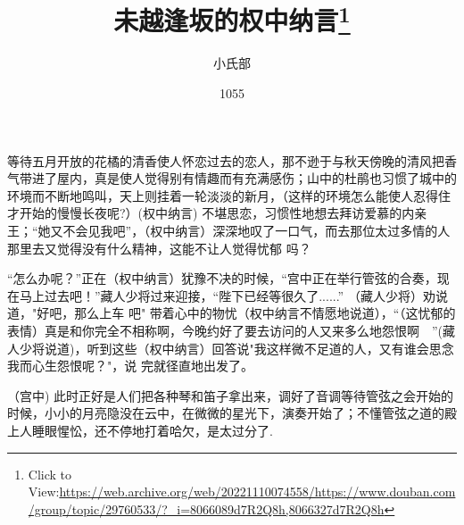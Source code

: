 \documentclass{article}
\title{未越逢坂的权中纳言\footnote{Click to View:\url{https://web.archive.org/web/20221110074558/https://www.douban.com/group/topic/29760533/?_i=8066089d7R2Q8h,8066327d7R2Q8h}}}
\author{小氏部}
\date{1055}
\begin{document}

\maketitle


\Large

﻿等待五月开放的花橘的清香使人怀恋过去的恋人，那不逊于与秋天傍晚的清风把香气带进了屋内，真是使人觉得别有情趣而有充满感伤；山中的杜鹃也习惯了城中的环境而不断地鸣叫，天上则挂着一轮淡淡的新月，（这样的环境怎么能使人忍得住才开始的慢慢长夜呢?）(权中纳言) 不堪思恋，习惯性地想去拜访爱慕的内亲王；“她又不会见我吧”，（权中纳言）深深地叹了一口气，而去那位太过多情的人那里去又觉得没有什么精神，这能不让人觉得忧郁
吗？ 

“怎么办呢？”正在（权中纳言）犹豫不决的时候，“宫中正在举行管弦的合奏，现在马上过去吧！”藏人少将过来迎接，“陛下已经等很久了......” （藏人少将）劝说道，"好吧，那么上车
\newpage
吧" 带着心中的物忧（权中纳言不情愿地说道），“（这忧郁的表情）真是和你完全不相称啊，今晚约好了要去访问的人又来多么地怨恨啊~~”(藏人少将说道)，听到这些（权中纳言）回答说"我这样微不足道的人，又有谁会思念我而心生怨恨呢？"，说
完就径直地出发了。 

（宫中) 此时正好是人们把各种琴和笛子拿出来，调好了音调等待管弦之会开始的时候，小小的月亮隐没在云中，在微微的星光下，演奏开始了；不懂管弦之道的殿上人睡眼惺忪，还不停地打着哈欠，是太过分了.
\end{document}
